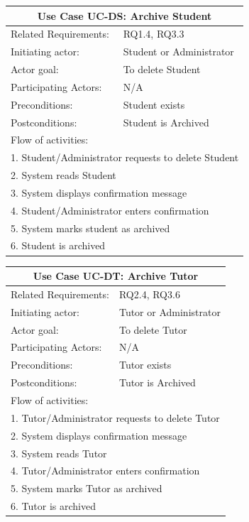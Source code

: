 \documentclass[12pt]{article}
\begin{document}
{		%
		\begin{tabular}{| l | p{10cm}| }
			\hline\multicolumn{2}{|c|}{ \textbf{Use Case UC-DS: Archive Student}} \\ \hline
			Related Requirements: & RQ1.4, RQ3.3 \\ \hline
			Initiating actor: & Student or Administrator \\ \hline
			Actor goal: & To delete Student\\ \hline
			Participating Actors: & N/A\\ \hline
			Preconditions: &Student exists\\ \hline
			Postconditions: & Student is Archived\\ \hline
			\multicolumn{2}{|l|}{Flow of activities:}\\ \hline
			\multicolumn{2}{|p{15cm}|}{1. Student/Administrator requests to delete Student}\\
			\multicolumn{2}{|p{15cm}|}{2. System reads Student}\\			
			\multicolumn{2}{|p{15cm}|}{3. System displays confirmation message}\\
			\multicolumn{2}{|p{15cm}|}{4. Student/Administrator enters confirmation}	\\		
			\multicolumn{2}{|p{15cm}|}{5. System marks student as archived}\\
			\multicolumn{2}{|l|}{6. Student is archived}	
			\\ \hline		
		\end{tabular}



		\begin{tabular}{| l | p{10cm}| }
			\hline\multicolumn{2}{|c|}{ \textbf{Use Case UC-DT: Archive Tutor}} \\ \hline
			Related Requirements: & RQ2.4, RQ3.6 \\ \hline
			Initiating actor: & Tutor or Administrator \\ \hline
			Actor goal: & To delete Tutor\\ \hline
			Participating Actors: & N/A\\ \hline
			Preconditions:& Tutor exists\\ \hline
			Postconditions: & Tutor is Archived\\ \hline
			\multicolumn{2}{|l|}{Flow of activities:}\\ \hline
			\multicolumn{2}{|p{15cm}|}{1. Tutor/Administrator requests to delete Tutor}\\
			\multicolumn{2}{|p{15cm}|}{2. System displays confirmation message}\\
			\multicolumn{2}{|p{15cm}|}{3. System reads Tutor}\\
			\multicolumn{2}{|p{15cm}|}{4. Tutor/Administrator enters confirmation}	\\		
			\multicolumn{2}{|p{15cm}|}{5. System marks Tutor as archived }\\
			\multicolumn{2}{|l|}{6. Tutor is archived}	
			\\ \hline		
		\end{tabular}



}
\end{document}
